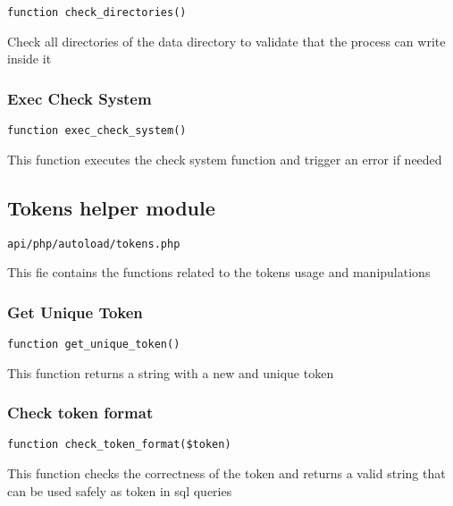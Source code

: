 \documentclass[a4paper]{article}
\begin{document}
\begin{lstlisting}
function check_directories()
\end{lstlisting}

Check all directories of the data directory to validate that the process can write inside it

\hypertarget{toc258}{}
\subsubsection{Exec Check System}

\begin{lstlisting}
function exec_check_system()
\end{lstlisting}

This function executes the check system function and trigger an error if needed

\hypertarget{toc259}{}
\subsection{Tokens helper module}

\begin{lstlisting}
api/php/autoload/tokens.php
\end{lstlisting}

This fie contains the functions related to the tokens usage and manipulations

\hypertarget{toc260}{}
\subsubsection{Get Unique Token}

\begin{lstlisting}
function get_unique_token()
\end{lstlisting}

This function returns a string with a new and unique token

\hypertarget{toc261}{}
\subsubsection{Check token format}

\begin{lstlisting}
function check_token_format($token)
\end{lstlisting}

This function checks the correctness of the token and returns a valid
string that can be used safely as token in sql queries
\end{document}
